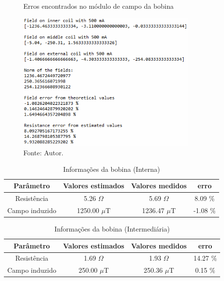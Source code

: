 \begin{figure}[H]
    \centering
     \caption{Erros encontrados no módulo de campo da bobina }
     \includegraphics[width=0.8\textwidth]{./img/bob/fieldErr.png}
     \caption*{Fonte: Autor.}\label{fig:err}
\end{figure}

\begin{table}[H]
    \centering
    \caption{Informações da bobina (Interna)}
    \begin{tabular}{|c|c|c|c|}
     \hline
     \textbf{Parâmetro} & \textbf{Valores estimados} & \textbf{Valores medidos} & \textbf{erro}\\
     \hline
     Resistência&  5.26 $\Omega$  & 5.69 $\Omega$ & 8.09 \% \\ 
     Campo induzido &   1250.00 $\mu$T  & 1236.47 $\mu$T & -1.08 \% \\ \hline
     
    \end{tabular}
    \label{tab:intCoil}
\end{table}

\begin{table}[H]
    \centering
    \caption{Informações da bobina (Intermediária)}
    \begin{tabular}{|c|c|c|c|}
     \hline
     \textbf{Parâmetro} & \textbf{Valores estimados} & \textbf{Valores medidos} & \textbf{erro}\\
     \hline
     Resistência&  1.69 $\Omega$  & 1.93 $\Omega$ & 14.27 \% \\ 
     Campo induzido &  250.00 $\mu$T  & 250.36 $\mu$T & 0.15 \% \\ \hline
     
    \end{tabular}
    \label{tab:midCoil}
\end{table}

